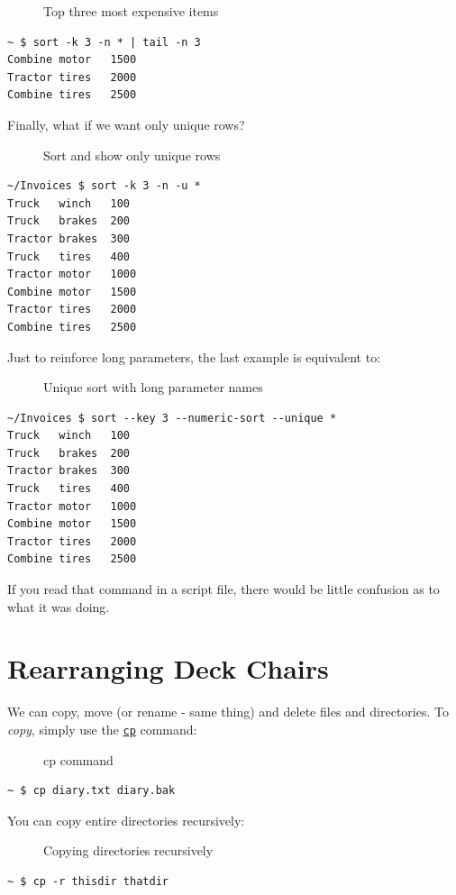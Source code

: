 \documentclass[10pt,]{book}
\numberwithin{figure}{chapter}
\DeclareRobustCommand{\drcap}[1]{\begin{figure}[H]\caption{#1}\end{figure}}
\DeclareRobustCommand{\drcmd}[1]{\index{Commands!#1}}
\begin{document}
\drcap{Top three most expensive items}

\begin{verbatim}
~ $ sort -k 3 -n * | tail -n 3
Combine motor   1500
Tractor tires   2000
Combine tires   2500
\end{verbatim}

Finally, what if we want only unique rows?

\drcap{Sort and show only unique rows}

\begin{verbatim}
~/Invoices $ sort -k 3 -n -u *
Truck   winch   100
Truck   brakes  200
Tractor brakes  300
Truck   tires   400
Tractor motor   1000
Combine motor   1500
Tractor tires   2000
Combine tires   2500
\end{verbatim}

Just to reinforce long parameters, the last example is equivalent to:

\drcap{Unique sort with long parameter names}

\begin{verbatim}
~/Invoices $ sort --key 3 --numeric-sort --unique *
Truck   winch   100
Truck   brakes  200
Tractor brakes  300
Truck   tires   400
Tractor motor   1000
Combine motor   1500
Tractor tires   2000
Combine tires   2500
\end{verbatim}

If you read that command in a script file, there would be little
confusion as to what it was doing.

\section{Rearranging Deck Chairs}\label{rearranging-deck-chairs}

We can copy, move (or rename - same thing) and delete files and
directories. To \emph{copy}, simply use the
\href{http://linux.die.net/man/1/cp}{\texttt{cp}}\drcmd{cp} command:

\drcap{cp command}

\begin{verbatim}
~ $ cp diary.txt diary.bak
\end{verbatim}

You can copy entire directories recursively:

\drcap{Copying directories recursively}

\begin{verbatim}
~ $ cp -r thisdir thatdir
\end{verbatim}
\end{document}
